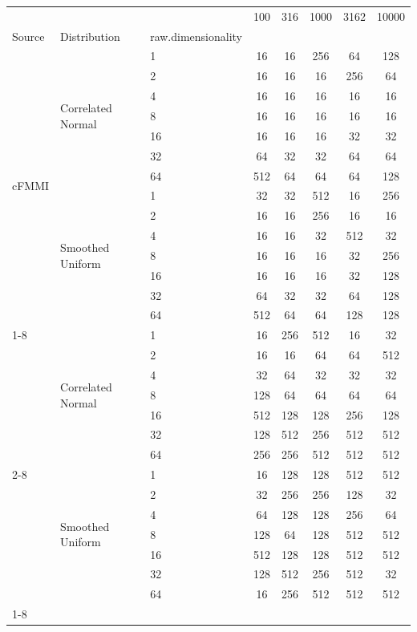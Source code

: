 \begin{tabular}{lllccccc}
\toprule
 &  &  & 100 & 316 & 1000 & 3162 & 10000 \\
Source & Distribution & raw.dimensionality &  &  &  &  &  \\
\midrule
\multirow[l]{14}{*}{cFMMI} & \multirow[l]{7}{*}{Correlated Normal} & 1 & 16 & 16 & 256 & 64 & 128 \\
 &  & 2 & 16 & 16 & 16 & 256 & 64 \\
 &  & 4 & 16 & 16 & 16 & 16 & 16 \\
 &  & 8 & 16 & 16 & 16 & 16 & 16 \\
 &  & 16 & 16 & 16 & 16 & 32 & 32 \\
 &  & 32 & 64 & 32 & 32 & 64 & 64 \\
 &  & 64 & 512 & 64 & 64 & 64 & 128 \\
\cmidrule{2-8}
 & \multirow[l]{7}{*}{Smoothed Uniform} & 1 & 32 & 32 & 512 & 16 & 256 \\
 &  & 2 & 16 & 16 & 256 & 16 & 16 \\
 &  & 4 & 16 & 16 & 32 & 512 & 32 \\
 &  & 8 & 16 & 16 & 16 & 32 & 256 \\
 &  & 16 & 16 & 16 & 16 & 32 & 128 \\
 &  & 32 & 64 & 32 & 32 & 64 & 128 \\
 &  & 64 & 512 & 64 & 64 & 128 & 128 \\
\cmidrule{1-8} \cmidrule{2-8}
\multirow[l]{14}{*}{jFMMI} & \multirow[l]{7}{*}{Correlated Normal} & 1 & 16 & 256 & 512 & 16 & 32 \\
 &  & 2 & 16 & 16 & 64 & 64 & 512 \\
 &  & 4 & 32 & 64 & 32 & 32 & 32 \\
 &  & 8 & 128 & 64 & 64 & 64 & 64 \\
 &  & 16 & 512 & 128 & 128 & 256 & 128 \\
 &  & 32 & 128 & 512 & 256 & 512 & 512 \\
 &  & 64 & 256 & 256 & 512 & 512 & 512 \\
\cmidrule{2-8}
 & \multirow[l]{7}{*}{Smoothed Uniform} & 1 & 16 & 128 & 128 & 512 & 512 \\
 &  & 2 & 32 & 256 & 256 & 128 & 32 \\
 &  & 4 & 64 & 128 & 128 & 256 & 64 \\
 &  & 8 & 128 & 64 & 128 & 512 & 512 \\
 &  & 16 & 512 & 128 & 128 & 512 & 512 \\
 &  & 32 & 128 & 512 & 256 & 512 & 32 \\
 &  & 64 & 16 & 256 & 512 & 512 & 512 \\
\cmidrule{1-8} \bottomrule
\end{tabular}
